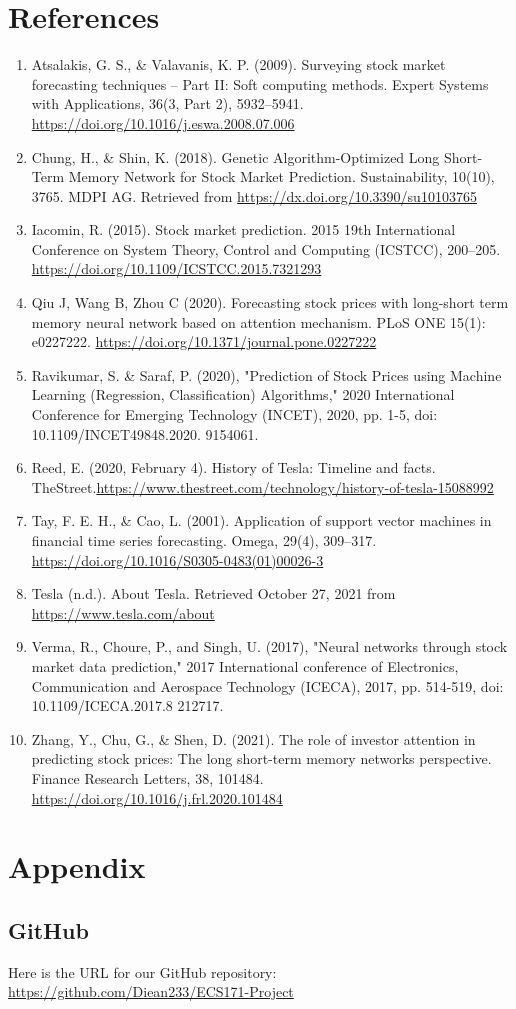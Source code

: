 \documentclass[12pt,a4paper]{article}
\begin{document}
\section*{References}
\begin{enumerate}
    \item Atsalakis, G. S., \& Valavanis, K. P. (2009). Surveying stock market forecasting techniques – Part II: Soft computing methods. Expert Systems with Applications, 36(3, Part 2), 5932–5941. \url{https://doi.org/10.1016/j.eswa.2008.07.006}
    \item Chung, H., \& Shin, K. (2018). Genetic Algorithm-Optimized Long Short-Term Memory Network for Stock Market Prediction. Sustainability, 10(10), 3765. MDPI AG. Retrieved from \url{https://dx.doi.org/10.3390/su10103765 }
    \item Iacomin, R. (2015). Stock market prediction. 2015 19th International Conference on System Theory, Control and Computing (ICSTCC), 200–205. \url{https://doi.org/10.1109/ICSTCC.2015.7321293}
    \item Qiu J, Wang B, Zhou C (2020). Forecasting stock prices with long-short term memory neural network based on attention mechanism. PLoS ONE 15(1): e0227222.  \url{https://doi.org/10.1371/journal.pone.0227222}
    \item Ravikumar, S. \& Saraf, P. (2020), "Prediction of Stock Prices using Machine Learning (Regression, Classification) Algorithms," 2020 International Conference for Emerging Technology (INCET), 2020, pp. 1-5, doi: 10.1109/INCET49848.2020.
    9154061.
    \item Reed, E. (2020, February 4). History of Tesla: Timeline and facts. TheStreet.\url{https://www.thestreet.com/technology/history-of-tesla-15088992}
    \item Tay, F. E. H., \& Cao, L. (2001). Application of support vector machines in financial time series forecasting. Omega, 29(4), 309–317.  \url{https://doi.org/10.1016/S0305-0483(01)00026-3}
    \item Tesla (n.d.). About Tesla. Retrieved October 27, 2021 from \url{https://www.tesla.com/about }
    \item Verma, R., Choure, P., and Singh, U. (2017), "Neural networks through stock market data prediction," 2017 International conference of Electronics, Communication and Aerospace Technology (ICECA), 2017, pp. 514-519, doi: 10.1109/ICECA.2017.8
    212717.
    \item Zhang, Y., Chu, G., \& Shen, D. (2021). The role of investor attention in predicting stock prices: The long short-term memory networks perspective. Finance Research Letters, 38, 101484.  \url{https://doi.org/10.1016/j.frl.2020.101484}
\end{enumerate}

\appendix
\section{Appendix}

\subsection{GitHub}

Here is the URL for our GitHub repository:\\

\url{https://github.com/Diean233/ECS171-Project}
\end{document}
